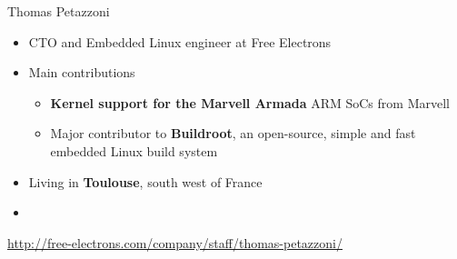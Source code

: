 \begin{frame}{Thomas Petazzoni}
  \begin{itemize}
  \item CTO and Embedded Linux engineer at Free Electrons
  \item Main contributions
    \begin{itemize}
    \item {\bf Kernel support for the Marvell Armada} ARM SoCs from
      Marvell
    \item Major contributor to {\bf Buildroot}, an open-source, simple and
      fast embedded Linux build system
    \end{itemize}
  \item Living in {\bf Toulouse}, south west of France
  \item {}
  \end{itemize}
  {\small \url{http://free-electrons.com/company/staff/thomas-petazzoni/}}
\end{frame}


